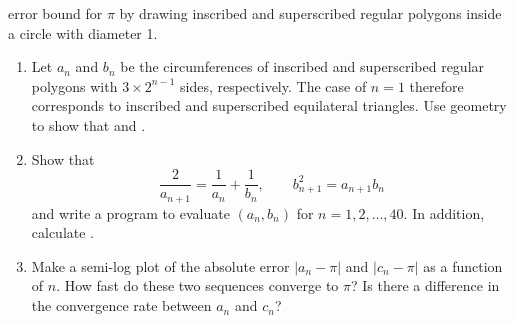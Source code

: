 \documentclass[12pt]{article}
\begin{document}
\begin{enumerate}
    error bound for $\pi$ by drawing inscribed and superscribed regular
    polygons inside a circle with diameter 1.
    \begin{enumerate}
      \item Let $a_n$ and $b_n$ be the circumferences of inscribed and
	superscribed regular polygons with $3 \times 2^{n-1}$ sides,
	respectively. The case of $n=1$ therefore corresponds to inscribed and
	superscribed equilateral triangles. Use geometry to show that
	 and .
      \item Show that
	\[
	\frac{2}{a_{n+1}} = \frac{1}{a_n} + \frac{1}{b_n}, \qquad b_{n+1}^2 = a_{n+1}b_n
	\]
	and write a program to evaluate $(a_n,b_n)$ for $n=1,2,\ldots,40$.
	In addition, calculate . 
      \item Make a semi-log plot of the absolute error $|a_n-\pi|$ and
	$|c_n-\pi|$ as a function of $n$. How fast do these two sequences
	converge to $\pi$? Is there a difference in the convergence rate
	between $a_n$ and $c_n$?
    \end{enumerate}
\end{enumerate}
\end{document}
